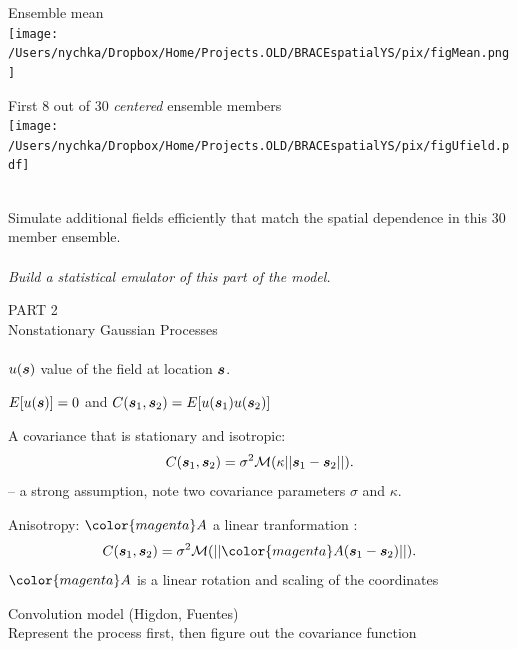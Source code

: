 \documentclass[bgimage]{/Users/nychka/Dropbox/Home/Tex/pfuef/pfuef}
\def\Mycomment#1{{\color{midnightblue}{\it  {\large #1}}}}
\begin{document}
 \begin{minipage}[t]{3in}
 \vspace{0in}
 Ensemble mean  \\
 \texttt{[image: /Users/nychka/Dropbox/Home/Projects.OLD/BRACEspatialYS/pix/figMean.png]}
 \end{minipage}
 \begin{minipage}[t]{7in}
 \vspace{0in}
 First 8  out of 30 {\it centered} ensemble members \\
\texttt{[image: /Users/nychka/Dropbox/Home/Projects.OLD/BRACEspatialYS/pix/figUfield.pdf]}  \\
  \end{minipage}
  \\
\Mycomment{Goal:} 
 Simulate additional fields efficiently that match the spatial dependence in this 30 member ensemble. 
 \\
 \\ \hspace*{1in} {\it Build a statistical emulator of this part of the model.}
 
\slide{}
{\huge  PART 2 \\ 
Nonstationary Gaussian Processes}
\\ \\



$u(\mbox{\boldmath $s$} )$ value of the field at location $\mbox{\boldmath $s$} $. 

\bdot $E[ u(\mbox{\boldmath $s$} ) ] =0 $  and  $C( \mbox{\boldmath $s$} _1, \mbox{\boldmath $s$} _2) = E[ u(\mbox{\boldmath $s$} _1)u(\mbox{\boldmath $s$} _2) ]$ 

\bdot A covariance  that  is stationary and isotropic:  
\[C( \mbox{\boldmath $s$} _1, \mbox{\boldmath $s$} _2) =  \sigma^2  {\cal{M}}( \kappa || \mbox{\boldmath $s$} _1 - \mbox{\boldmath $s$} _2 || ).\]
 -- a strong assumption, note two covariance parameters $\sigma$ and $\kappa$. 
 
\bdot Anisotropy: ${\color{magenta} A}$ a linear tranformation :  
\[C( \bbs _1, \bbs _2) =  \sigma^2  \cM( || {\color{magenta} A} (\bbs _1 - \bbs _2) || ) .\]
 $ {\color{magenta} A}$ is a linear rotation and scaling of the coordinates 
 
\bdot Convolution model (Higdon, Fuentes) \\

Represent the process first, then figure out the covariance function 
\end{document}
